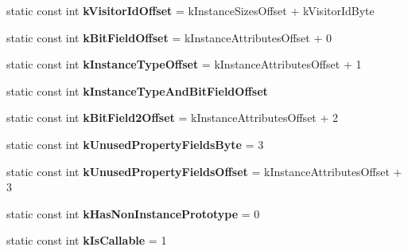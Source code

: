 \begin{DoxyCompactItemize}
\item 
static const int {\bfseries k\+Visitor\+Id\+Offset} = k\+Instance\+Sizes\+Offset + k\+Visitor\+Id\+Byte\hypertarget{classv8_1_1internal_1_1_map_a75fed4ddabed6fed23748405c5de491a}{}\label{classv8_1_1internal_1_1_map_a75fed4ddabed6fed23748405c5de491a}

\item 
static const int {\bfseries k\+Bit\+Field\+Offset} = k\+Instance\+Attributes\+Offset + 0\hypertarget{classv8_1_1internal_1_1_map_a346c93635c7bba2c256e1703121e9ea8}{}\label{classv8_1_1internal_1_1_map_a346c93635c7bba2c256e1703121e9ea8}

\item 
static const int {\bfseries k\+Instance\+Type\+Offset} = k\+Instance\+Attributes\+Offset + 1\hypertarget{classv8_1_1internal_1_1_map_a6a9a39baa24992d237b42edcf634db9d}{}\label{classv8_1_1internal_1_1_map_a6a9a39baa24992d237b42edcf634db9d}

\item 
static const int {\bfseries k\+Instance\+Type\+And\+Bit\+Field\+Offset}
\item 
static const int {\bfseries k\+Bit\+Field2\+Offset} = k\+Instance\+Attributes\+Offset + 2\hypertarget{classv8_1_1internal_1_1_map_a82252f8d0b1dbf43ae262d742ff4ac40}{}\label{classv8_1_1internal_1_1_map_a82252f8d0b1dbf43ae262d742ff4ac40}

\item 
static const int {\bfseries k\+Unused\+Property\+Fields\+Byte} = 3\hypertarget{classv8_1_1internal_1_1_map_a0ac532396cde877d9bcfa54f9b9db810}{}\label{classv8_1_1internal_1_1_map_a0ac532396cde877d9bcfa54f9b9db810}

\item 
static const int {\bfseries k\+Unused\+Property\+Fields\+Offset} = k\+Instance\+Attributes\+Offset + 3\hypertarget{classv8_1_1internal_1_1_map_afa596db997f369a1206e2acf2fa94d1d}{}\label{classv8_1_1internal_1_1_map_afa596db997f369a1206e2acf2fa94d1d}

\item 
static const int {\bfseries k\+Has\+Non\+Instance\+Prototype} = 0\hypertarget{classv8_1_1internal_1_1_map_a625118736a731f98f24fb0b46def35c4}{}\label{classv8_1_1internal_1_1_map_a625118736a731f98f24fb0b46def35c4}

\item 
static const int {\bfseries k\+Is\+Callable} = 1\hypertarget{classv8_1_1internal_1_1_map_a39e7b6b074bf2bcd46d62fa984e05bdb}{}\label{classv8_1_1internal_1_1_map_a39e7b6b074bf2bcd46d62fa984e05bdb}


\end{DoxyCompactItemize}
